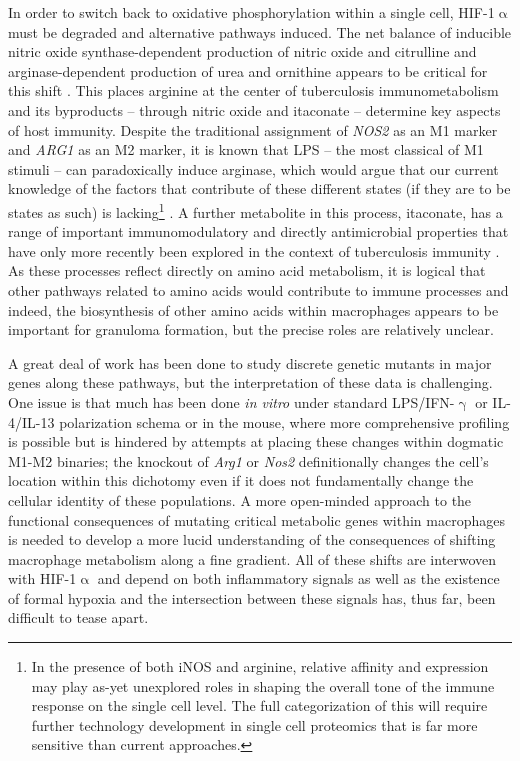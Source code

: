 In order to switch back to oxidative phosphorylation within a single cell, HIF-1$\upalpha$ must be degraded and alternative pathways induced. The net balance of inducible nitric oxide synthase-dependent production of nitric oxide and citrulline and arginase-dependent production of urea and ornithine appears to be critical for this shift \citep{Palmieri2020, Qualls2016}. This places arginine at the center of tuberculosis immunometabolism and its byproducts -- through nitric oxide and itaconate -- determine key aspects of host immunity. Despite the traditional assignment of \textit{NOS2} as an M1 marker and \textit{ARG1} as an M2 marker, it is known that LPS -- the most classical of M1 stimuli -- can paradoxically induce arginase, which would argue that our current knowledge of the factors that contribute of these different states (if they are to be states as such) is lacking\footnote{In the presence of both iNOS and arginine, relative affinity and expression may play as-yet unexplored roles in shaping the overall tone of the immune response on the single cell level. The full categorization of this will require further technology development in single cell proteomics that is far more sensitive than current approaches.} \citep{ElKasmi2008}. A further metabolite in this process, itaconate, has a range of important immunomodulatory and directly antimicrobial properties that have only more recently been explored in the context of tuberculosis immunity \citep{Jinich2022, He2021}. As these processes reflect directly on amino acid metabolism, it is logical that other pathways related to amino acids would contribute to immune processes and indeed, the biosynthesis of other amino acids within macrophages appears to be important for granuloma formation, but the precise roles are relatively unclear.

A great deal of work has been done to study discrete genetic mutants in major genes along these pathways, but the interpretation of these data is challenging. One issue is that much has been done \textit{in vitro} under standard LPS/IFN-$\upgamma$ or IL-4/IL-13 polarization schema or in the mouse, where more comprehensive profiling is possible but is hindered by attempts at placing these changes within dogmatic M1-M2 binaries; the knockout of \textit{Arg1} or \textit{Nos2} definitionally changes the cell's location within this dichotomy even if it does not fundamentally change the cellular identity of these populations. A more open-minded approach to the functional consequences of mutating critical metabolic genes within macrophages is needed to develop a more lucid understanding of the consequences of shifting macrophage metabolism along a fine gradient. All of these shifts are interwoven with HIF-1$\upalpha$ and depend on both inflammatory signals as well as the existence of formal hypoxia and the intersection between these signals has, thus far, been difficult to tease apart.


